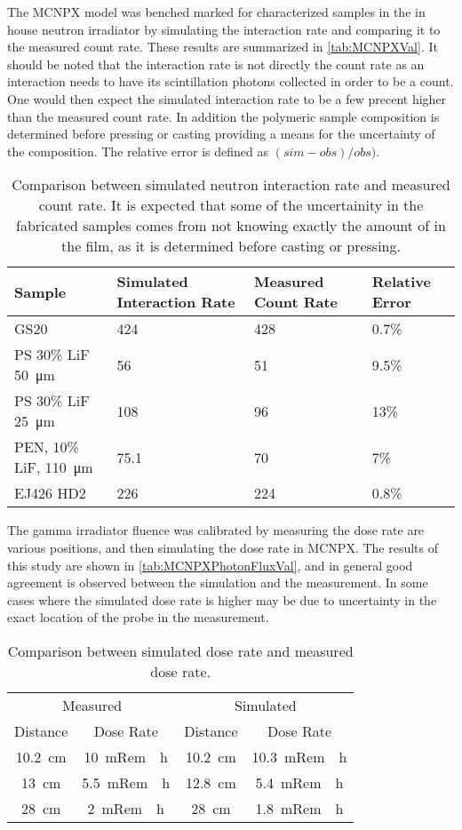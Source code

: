 The MCNPX model was benched marked for characterized samples in the in house  neutron irradiator by simulating the interaction rate and comparing it to the measured count rate.
These results are summarized in \autoref{tab:MCNPXVal}.
It should be noted that the interaction rate is not directly the count rate as an interaction needs to have its scintillation photons collected in order to be a count. 
One would then expect the simulated interaction rate to be a few precent higher than the measured count rate.
In addition the polymeric sample composition is determined before pressing or casting providing a means for the uncertainty of the composition.
The relative error is defined as $(sim-obs)/obs)$.
\begin{table}
	\centering
	\caption[MCNPX Neutron Validation Results]{Comparison between simulated neutron interaction rate and measured count rate. It is expected that some of the uncertainity in the fabricated samples comes from not knowing exactly the amount of  in the film, as it is determined before casting or pressing.}
	\label{tab:MCNPXVal}
	\begin{tabular}{m{4cm} | p{3cm} p{3cm} p{2cm}}
		\toprule
			Sample & Simulated Interaction Rate & Measured Count Rate & Relative Error \\
		\midrule
			GS20 & 424  & 428 & 0.7\%  \\ 
			PS 30\% LiF \SI{50}{\um} &  56 & 51 & 9.5\% \\
			PS 30\% LiF \SI{25}{\um} & 108 & 96 &13\%  \\
			PEN, 10\% LiF, \SI{110}{\um} & 75.1 & 70 & 7\% \\
			EJ426 HD2 & 226 & 224 & 0.8\% \\
		\bottomrule
	\end{tabular}
\end{table}

The gamma irradiator fluence was calibrated by measuring the dose rate are various positions, and then simulating the dose rate in MCNPX.
The results of this study are shown in \autoref{tab:MCNPXPhotonFluxVal}, and in general good agreement is observed between the simulation and the measurement.
In some cases where the simulated dose rate is higher may be due to uncertainty in the exact location of the probe in the measurement.
\begin{table}
	\centering
	\caption[MCNPX Photon Dose Rate Validation Results]{Comparison between simulated dose rate and measured dose rate.}
	\label{tab:MCNPXPhotonFluxVal}
	\begin{tabular}{c  c |c  c}
		\toprule
		\multicolumn{2}{c}{Measured} & \multicolumn{2}{c}{Simulated} \\
		Distance  & Dose Rate & Distance & Dose Rate \\
		\midrule
		\SI{10.2}{\cm} & \SI{10}{mRem \per h} & \SI{10.2}{\cm} & \SI{10.3}{mRem \per h} \\
		\SI{13}{\cm} & \SI{5.5}{mRem \per h} & \SI{12.8}{\cm} & \SI{5.4}{mRem \per h} \\
		\SI{28}{\cm} & \SI{2}{mRem \per h} & \SI{28}{\cm} & \SI{1.8}{mRem \per h} \\
		\bottomrule
	\end{tabular}
\end{table}
